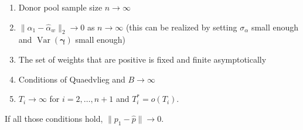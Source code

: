 \documentclass[12pt]{article}
\def\bs#1{\boldsymbol{#1}}
\DeclareMathOperator{\Var}{Var} %
\theoremstyle{definition}
\theoremstyle{definition}
\begin{document}
\begin{enumerate}
  \item Donor pool sample size $n \to \infty$
  \item $\|\alpha_1 - \hat{\alpha}_{w} \|_2 \to 0$ as $n\to \infty$ (this can be realized by setting $\sigma_{\alpha}$ small enough and $\Var(\bs{\gamma} )$ small enough)
  \item The set of weights that are positive is fixed and finite asymptotically 
  \item Conditions of Quaedvlieg and $B \to \infty$
  \item $T_i \to \infty$ for $i = 2,\ldots, n+1$ and $T_i^* =o(T_i)$.
\end{enumerate}





If all those conditions hold, $\| p_1-\hat{p}\| \to 0$.





  
\end{document}

